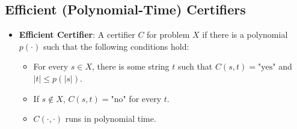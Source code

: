 \documentclass[12pt]{article}
\begin{document}
\subsection{Efficient (Polynomial-Time) Certifiers}
\begin{itemize}
    \item \textbf{Efficient Certifier}: A certifier $C$ for problem $X$ if there is a polynomial $p(\cdot)$ such that the following conditions hold:
    \begin{itemize}
        \item For every $s \in X$, there is some string $t$ such that $C(s, t) = \text{"yes"}$ and $\left| t \right| \leq p(\left| s \right|)$.
        \item If $s \notin X$, $C(s, t) = \text{"no"}$ for every $t$.
        \item $C(\cdot, \cdot)$ runs in polynomial time.
    \end{itemize}
\end{itemize}
\end{document}
